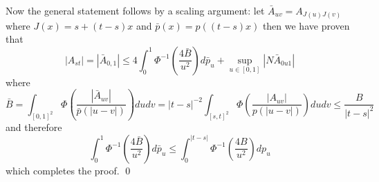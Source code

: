 \documentclass[a4paper,12pt,reqno]{amsproc}
\newcommand{\NN}{N}
\begin{document}
Now the general statement follows by a scaling argument: let $\bar
A_{uv} = A_{J(u) J(v)}$ where $J(x) = s+(t-s)x$ and $\bar p(x) =
p((t-s)x)$ then we have proven that
\begin{equation*}
|A_{st}| = |\bar A_{0,1}| \le  
   4 \int_{0}^{1} \Phi^{-1}\left(\frac{4 \bar B}{u^2}\right) d\bar p_u
   + \sup_{u \in [0,1]} |\NN \bar A_{0 u 1}|
\end{equation*}
  where
$$
\bar B = \int_{[0,1]^2} \Phi\left(\frac{|\bar A_{uv}|}{\bar
    p(|u-v|)}\right) du dv = |t-s|^{-2} \int_{[s,t]^2}
\Phi\left(\frac{| A_{uv}|}{ p(|u-v|)}\right) du dv \le \frac{B}{|t-s|^2} 
$$
and therefore
$$
 \int_{0}^{1} \Phi^{-1}\left(\frac{4 \bar B}{u^2}\right) d\bar p_u
\le \int_{0}^{|t-s|} \Phi^{-1}\left(\frac{4  B}{u^2}\right) d p_u
$$
which completes the proof.
\qed
\end{document}
